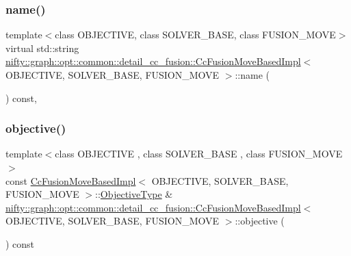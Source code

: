 \subsubsection{\texorpdfstring{name()}{name()}}
{\footnotesize\ttfamily template$<$class O\+B\+J\+E\+C\+T\+I\+VE, class S\+O\+L\+V\+E\+R\+\_\+\+B\+A\+SE, class F\+U\+S\+I\+O\+N\+\_\+\+M\+O\+VE$>$ \\
virtual std\+::string \hyperlink{classnifty_1_1graph_1_1opt_1_1common_1_1detail__cc__fusion_1_1CcFusionMoveBasedImpl}{nifty\+::graph\+::opt\+::common\+::detail\+\_\+cc\+\_\+fusion\+::\+Cc\+Fusion\+Move\+Based\+Impl}$<$ O\+B\+J\+E\+C\+T\+I\+VE, S\+O\+L\+V\+E\+R\+\_\+\+B\+A\+SE, F\+U\+S\+I\+O\+N\+\_\+\+M\+O\+VE $>$\+::name (\begin{DoxyParamCaption}{ }\end{DoxyParamCaption}) const\hspace{0.3cm}{\ttfamily [inline]}, {\ttfamily [virtual]}}

\mbox{\label{classnifty_1_1graph_1_1opt_1_1common_1_1detail__cc__fusion_1_1CcFusionMoveBasedImpl_af9355be55bd8497b059a2e5b1842a20b}} 
\subsubsection{\texorpdfstring{objective()}{objective()}}
{\footnotesize\ttfamily template$<$class O\+B\+J\+E\+C\+T\+I\+VE , class S\+O\+L\+V\+E\+R\+\_\+\+B\+A\+SE , class F\+U\+S\+I\+O\+N\+\_\+\+M\+O\+VE $>$ \\
const \hyperlink{classnifty_1_1graph_1_1opt_1_1common_1_1detail__cc__fusion_1_1CcFusionMoveBasedImpl}{Cc\+Fusion\+Move\+Based\+Impl}$<$ O\+B\+J\+E\+C\+T\+I\+VE, S\+O\+L\+V\+E\+R\+\_\+\+B\+A\+SE, F\+U\+S\+I\+O\+N\+\_\+\+M\+O\+VE $>$\+::\hyperlink{classnifty_1_1graph_1_1opt_1_1common_1_1detail__cc__fusion_1_1CcFusionMoveBasedImpl_aa9866b5feaad59ab66248cbefc28e6c0}{Objective\+Type} \& \hyperlink{classnifty_1_1graph_1_1opt_1_1common_1_1detail__cc__fusion_1_1CcFusionMoveBasedImpl}{nifty\+::graph\+::opt\+::common\+::detail\+\_\+cc\+\_\+fusion\+::\+Cc\+Fusion\+Move\+Based\+Impl}$<$ O\+B\+J\+E\+C\+T\+I\+VE, S\+O\+L\+V\+E\+R\+\_\+\+B\+A\+SE, F\+U\+S\+I\+O\+N\+\_\+\+M\+O\+VE $>$\+::objective (\begin{DoxyParamCaption}{ }\end{DoxyParamCaption}) const\hspace{0.3cm}{\ttfamily [virtual]}}

